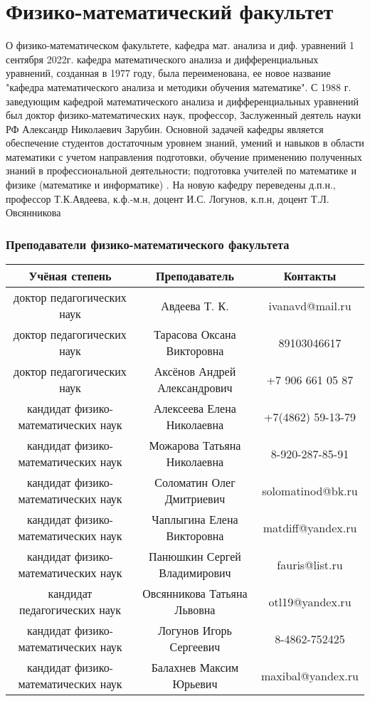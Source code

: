 \documentclass{beamer}
\begin{document}
\section{Физико-математический факультет}
\begin{frame}{О физико-математическом факультете, кафедра мат. анализа и диф. уравнений}
1 сентября 2022г. кафедра математического анализа и дифференциальных уравнений, созданная в 1977 году, была переименована, ее новое название "кафедра математического анализа и методики обучения математике". С 1988 г. заведующим кафедрой математического анализа и дифференциальных уравнений был доктор физико-математических наук, профессор, Заслуженный деятель науки РФ Александр Николаевич Зарубин. Основной задачей кафедры является обеспечение студентов достаточным уровнем знаний, умений и навыков в области математики с учетом направления подготовки, обучение применению полученных знаний в профессиональной деятельности; подготовка учителей по математике и физике (математике и информатике) . На новую кафедру переведены д.п.н., профессор Т.К.Авдеева, к.ф.-м.н, доцент И.С. Логунов, к.п.н, доцент Т.Л. Овсянникова
\end{frame}

\begin{frame}
\begin{center}
\frametitle{Преподаватели физико-математического факультета}
\begin{tabular}{ |c|c|c| } 
 \hline
 Учёная степень & Преподаватель & Контакты \\ 
 \hline
 доктор педагогических наук & Авдеева Т. К. & ivanavd@mail.ru \\
 \hline
 доктор педагогических наук & Тарасова Оксана Викторовна & 89103046617 \\
 \hline
 доктор педагогических наук & Аксёнов Андрей Александрович & +7 906 661 05 87 \\
 \hline
 кандидат физико-математических наук & Алексеева Елена Николаевна & +7(4862) 59-13-79 \\
 \hline
 кандидат физико-математических наук & Можарова Татьяна Николаевна &  8-920-287-85-91 \\
 \hline
 кандидат физико-математических наук & Соломатин Олег Дмитриевич & solomatinod@bk.ru \\
 \hline
 кандидат физико-математических наук & Чаплыгина Елена Викторовна & matdiff@yandex.ru \\
 \hline
 кандидат физико-математических наук & Панюшкин Сергей Владимирович & fauris@list.ru \\
 \hline
 кандидат педагогических наук & Овсянникова Татьяна Львовна & otl19@yandex.ru \\
 \hline
 кандидат физико-математических наук & Логунов Игорь Сергеевич & 8-4862-752425\\
 \hline
 кандидат физико-математических наук & Балахнев Максим Юрьевич & maxibal@yandex.ru \\
 \hline
 
\end{tabular}
\end{center}
\end{frame}
\end{document}
